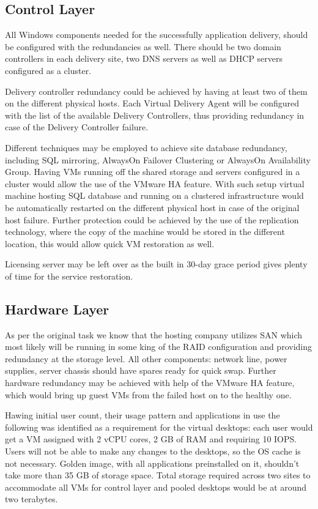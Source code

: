 \documentclass[a4paper]{article}
\begin{document}
	\subsection{Control Layer}
	All Windows components needed for the successfully application delivery, should be configured with the redundancies as well. There should be two domain controllers in each delivery site, two DNS servers as well as DHCP servers configured as a cluster.
	
	Delivery controller redundancy could be achieved by having at least two of them on the different physical hosts. Each Virtual Delivery Agent will be configured with the list of the available Delivery Controllers, thus providing redundancy in case of the Delivery Controller failure.
	
	Different techniques may be employed to achieve site database redundancy, including SQL mirroring, AlwaysOn Failover Clustering or AlwaysOn Availability Group. Having VMs running off the shared storage and servers configured in a cluster would allow the use of the VMware HA feature. With such setup virtual machine hosting SQL database and running on a clustered infrastructure would be automatically restarted on the different physical host in case of the original host failure. Further protection could be achieved by the use of the replication technology, where the copy of the machine would be stored in the different location, this would allow quick VM restoration as well.
	
	Licensing server may be left over as the built in 30-day grace period gives plenty of time for the service restoration.	
	\subsection{Hardware Layer}
	As per the original task we know that the hosting company utilizes SAN which most likely will be running in some king of the RAID configuration and providing redundancy at the storage level. All other components: network line, power supplies, server chassis should have spares ready for quick swap. Further hardware redundancy may be achieved with help of the VMware HA feature, which would bring up guest VMs from the failed host on to the healthy one.
	
	Hawing initial user count, their usage pattern and applications in use the following was identified as a requirement for the virtual desktops: each user would get a VM assigned with 2 vCPU cores, 2 GB of RAM and requiring 10 IOPS. Users will not be able to make any changes to the desktops, so the OS cache is not necessary. Golden image, with all applications preinstalled on it, shouldn't take more than 35 GB of storage space. Total storage required across two sites to accommodate all VMs for control layer and pooled desktops would be at around two terabytes.
	
\end{document}
